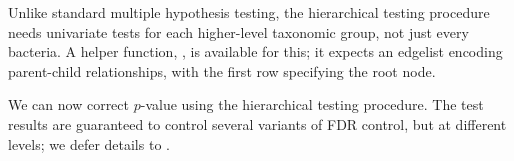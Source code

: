 Unlike standard multiple hypothesis testing, the hierarchical testing
procedure needs univariate tests for each higher-level taxonomic
group, not just every bacteria. A helper function,
, is available for this; it expects an edgelist
encoding parent-child relationships, with the first row specifying the
root node.

\begin{knitrout}
\color{fgcolor}\begin{kframe}
\begin{alltt}
 \hlkwb{<-} \hlopt{$}
 \hlkwb{<-} 
 \hlkwb{<-} \hlstd{el0[}\hlopt{:}\hlstd{, ]}
 \hlkwb{<-}  \hlstd{(}\hlopt{$}
\hlstd{el[,} \hlstd{]} \hlkwb{<-} \hlstd{el_names[el0[,} \hlstd{]]}
\hlstd{el[,} \hlstd{]} \hlkwb{<-} \hlstd{el_names[}\hlstd{(el0[,} \hlstd{])]}
 \hlkwb{<-}  \hlopt{$}
\end{alltt}
\end{kframe}
\end{knitrout}

We can now correct $p$-value using the hierarchical testing
procedure. The test results are guaranteed to control several
variants of FDR control, but at different levels; we defer
details to \cite{benjamini2003hierarchical, benjamini2014selective,
  sankaran2014structssi}.

